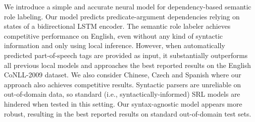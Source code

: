 We introduce a simple and accurate neural model for dependency-based semantic role labeling. Our model predicts predicate-argument dependencies relying on states of a bidirectional LSTM encoder. The semantic role labeler achieves competitive performance on English, even without any kind of syntactic information and only using local inference. However, when automatically predicted part-of-speech tags are provided as input, it substantially outperforms all previous local models and approaches the best reported results on the English CoNLL-2009 dataset. We also consider Chinese, Czech and Spanish where our approach also achieves competitive results. Syntactic parsers are unreliable on out-of-domain data, so standard (i.e., syntactically-informed) SRL models are hindered when tested in this setting. Our syntax-agnostic model appears more robust, resulting in the best reported results on standard out-of-domain test sets.
